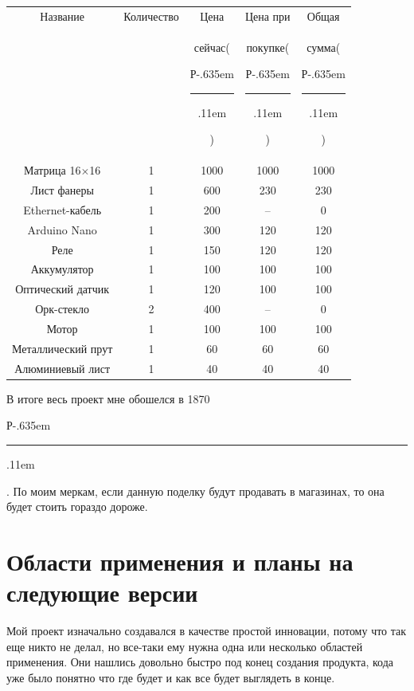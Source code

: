 \documentclass[a4paper, 12pt]{article}
\newcommand{\rub}{{\rm{Р}\kern-.635em\rule[.5ex]{.52em}{.04em}\kern.11em}}
\begin{document}
\begin{center}
  \begin{tabular}{|c|c|c|c|c|}
    \hline
    Название             & Количество & Цена         & Цена при      & Общая       \\
                         &            & сейчас(\rub) & покупке(\rub) & сумма(\rub) \\
    \hline
    Матрица 16$\times$16 & 1          & 1000         & 1000          & 1000        \\
    \hline
    Лист фанеры          & 1          & 600          & 230           & 230         \\
    \hline
    Ethernet-кабель      & 1          & 200          & --            & 0           \\
    \hline
    Arduino Nano         & 1          & 300          & 120           & 120         \\
    \hline
    Реле                 & 1          & 150          & 120           & 120         \\
    \hline
    Аккумулятор          & 1          & 100          & 100           & 100         \\
    \hline
    Оптический датчик    & 1          & 120          & 100           & 100         \\
    \hline
    Орк-стекло           & 2          & 400          & --            & 0           \\
    \hline
    Мотор                & 1          & 100          & 100           & 100         \\
    \hline
    Металлический прут   & 1          & 60           & 60            & 60          \\
    \hline
    Алюминиевый лист     & 1          & 40           & 40            & 40          \\
    \hline
  \end{tabular}
\end{center}
В итоге весь проект мне обошелся в 1870\rub. По моим меркам, если данную поделку будут продавать в магазинах, то она будет стоить гораздо дороже.
\newpage
\section{Области применения и планы на следующие версии}

Мой проект изначально создавался в качестве простой инновации, потому
что так еще никто не делал, но все-таки ему нужна одна или несколько
областей применения. Они нашлись довольно быстро под конец создания
продукта, кода уже было понятно что где будет и как все будет
выглядеть в конце.
\end{document}
